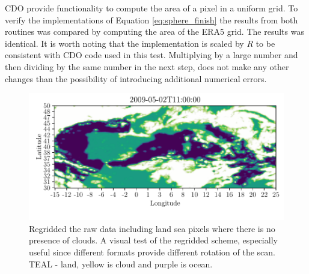 CDO provide functionality to compute the area of a pixel in a uniform grid. To verify the implementations of Equation \ref{eq:sphere_finish} the results from both routines was compared by computing the area of the ERA5 grid. The results was identical. It is worth noting that the implementation is scaled by $R$ to be consistent with CDO code used in this test. Multiplying by a large number and then dividing by the same number in the next step, does not make any other changes than the possibility of introducing additional numerical errors. 
\begin{figure}
    \centering
    \includegraphics{python_figs/visual_regridding.pdf}
    \caption{Regridded the raw data including land sea pixels where there is no presence of clouds. A visual test of the regridded scheme, especially useful since different formats provide different rotation of the scan. TEAL - land, yellow is cloud and purple is ocean.}
    \label{fig:visual_inspection_regridding}
\end{figure}

